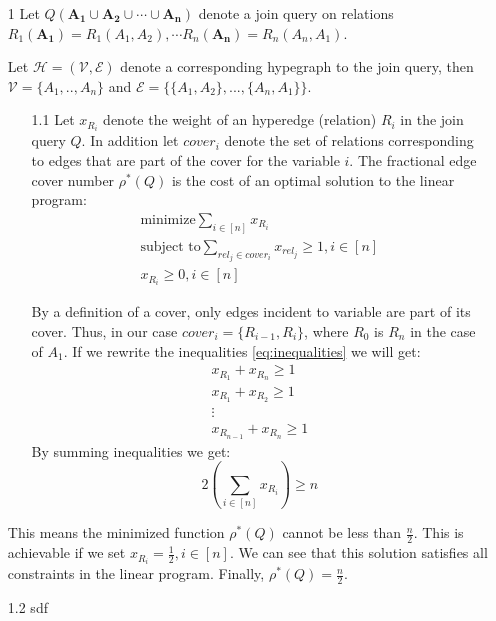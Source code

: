 \documentclass[10pt,a4paper]{article}
\begin{document}
\begin{enumerate}
\item[1]
Let $Q(\mathbf{A_1} \cup \mathbf{A_2} \cup \cdots \cup \mathbf{A_n})$ denote a join query on relations $R_1(\mathbf{A_1})=R_1(A_1, A_2), \cdots R_n(\mathbf{A_n})=R_n(A_n, A_1)$.

Let $\mathcal{H}=(\mathcal{V}, \mathcal{E})$ denote a corresponding hypegraph to the join query, then $\mathcal{V} = \{A_1, .., A_n\}$ and $\mathcal{E} =\{\{A_1, A_2\}, ..., \{A_n, A_1\}\}$.
\begin{enumerate}
\item[1.1]
Let $x_{R_i}$ denote the weight of an hyperedge (relation) $R_i$ in the join query $Q$. In addition let $cover_i$ denote the set of relations corresponding to edges that are part of the cover for the variable $i$. The fractional edge cover number $\rho^{*}(Q)$ is the cost of an optimal solution to the linear program:
\begin{eqnarray}
\text{minimize} \sum_{i\in [n]} x_{R_i}  \label{eq:minimize} \\
\text{subject to} \sum_{rel_j \in cover_i} x_{rel_j} \geq 1, i \in [n]  \label{eq:inequalities}\\
x_{R_i} \geq 0, i \in [n] \nonumber
\end{eqnarray}

By a definition of a cover, only edges incident  to variable are part of its cover. Thus, in our case $cover_i =\{ R_{i-1}, R_i \}$, where $R_0$ is $R_n$ in the case of $A_1$. If we rewrite the inequalities \ref{eq:inequalities} we will get:
\begin{eqnarray}
x_{R_1} +  x_{R_n} \geq 1 \nonumber \\
x_{R_1} +  x_{R_2} \geq 1\nonumber \\
\vdots \nonumber \\
x_{R_{n-1}} +  x_{R_n} \geq 1 \nonumber
\end{eqnarray}
By summing inequalities we get:
$$2\left(\sum_{i\in [n]} x_{R_i}\right) \geq n$$
\end{enumerate}
This means the minimized function $\rho^*(Q)$ cannot  be less than $\frac{n}{2}$. This is achievable if we set $x_{R_i}=\frac{1}{2}, i \in [n]$. We can see that this solution satisfies all constraints in the linear program. Finally, $\rho^*(Q)=\frac{n}{2}$. 
\\

\item[1.2]
sdf

\end{enumerate}
\end{document}

